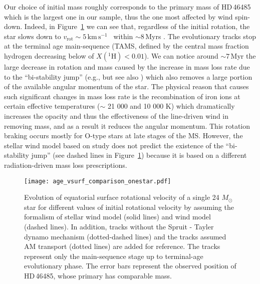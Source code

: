 \documentclass{aa}
\newcommand{\kms}{$\mathrm{km\,s^{-1}}$}
\DeclareRobustCommand{\Figref}[1]{Figure~\ref{#1}}
\begin{document}
Our choice of initial mass roughly corresponds to the primary
  mass of HD\,46485 which is the largest one in our sample, thus the one
most affected by wind spin-down. Indeed, in
\Figref{fig:v_surf_one_star} we can see that, regardless of the
initial rotation, the star slows down to
$v_\mathrm{rot}\sim 5$\,\kms~ within $\sim$8\,Myrs \citep[solid lines,][]{Vink_2001}. The evolutionary tracks stop at the
terminal age main-sequence (TAMS, defined by the central mass fraction
hydrogen decreasing below of $X(^{1}\mathrm{H})<0.01$). We can
notice around $\sim7$\,Myr the large decrease in rotation and mass caused by
  the increase in mass loss rate due to the ``bi-stability jump''
(e.g.,\citealt{Vink_2001} but see also \citealt{bjorklund:21})
which also removes a large portion of the available angular
momentum of the star. The physical reason that causes
such significant changes in mass loss rate is the recombination of
  iron ions at certain effective temperatures ($\sim$ 21 000 and 10
000 K) which dramatically increases the opacity and thus the
  effectiveness of the line-driven wind in removing mass, and as a result it reduces the angular momentum.
This rotation braking  occurs mostly for O-type stars at late stages of the MS. However, the stellar wind model based on \citet{Bjorklund_2023} study does not predict the existence of the ``bi-stability jump'' (see dashed lines in \Figref{fig:v_surf_one_star}) because it is based on a different radiation-driven mass loss prescriptions.


\begin{figure}[!ht]
  \centering
  \texttt{[image: age\_vsurf\_comparison\_onestar.pdf]}
  \caption{Evolution of equatorial surface rotational velocity of a
    single 24 $M_{\odot}$ star for different values of initial
    rotational velocity by assuming the formalism of \citet{Vink_2001} stellar wind model (solid lines) and \citet{Bjorklund_2023} wind model (dashed lines). In addition, tracks without the Spruit - Tayler dynamo mechanism (dotted-dashed lines) and the tracks assumed \citet{fuller:19} AM transport (dotted lines) are added for reference.
 The tracks represent only the main-sequence
    stage up to terminal-age evolutionary phase. The error bars
    represent the observed position of HD\,46485, whose primary has comparable mass.}
  \label{fig:v_surf_one_star}
\end{figure}
\end{document}

